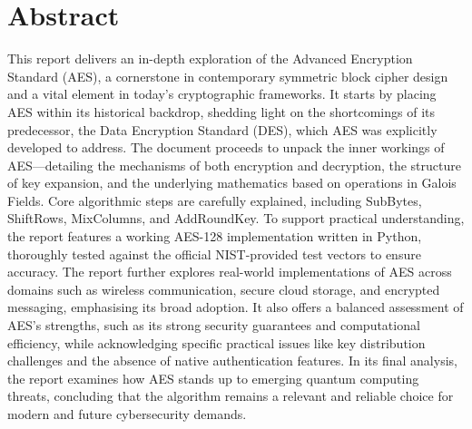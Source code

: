 \section*{Abstract} %

This report delivers an in-depth exploration of the Advanced Encryption Standard (AES), 
a cornerstone in contemporary symmetric block cipher design and a vital element in today’s cryptographic frameworks. 
It starts by placing AES within its historical backdrop, 
shedding light on the shortcomings of its predecessor, 
the Data Encryption Standard (DES), 
which AES was explicitly developed to address. 
The document proceeds to unpack the inner workings of AES—detailing the mechanisms of both encryption and decryption, 
the structure of key expansion, and the underlying mathematics based on operations in Galois Fields. 
Core algorithmic steps are carefully explained, 
including SubBytes, ShiftRows, MixColumns, and AddRoundKey. 
To support practical understanding, the report features a working AES-128 implementation written in Python, thoroughly tested against the official NIST-provided test vectors to ensure accuracy. 
The report further explores real-world implementations of AES across domains such as wireless communication, 
secure cloud storage, and encrypted messaging, emphasising its broad adoption. 
It also offers a balanced assessment of AES’s strengths, 
such as its strong security guarantees and computational efficiency, 
while acknowledging specific practical issues like key distribution challenges and the absence of native authentication features. 
In its final analysis, 
the report examines how AES stands up to emerging quantum computing threats, 
concluding that the algorithm remains a relevant and reliable choice for modern and future cybersecurity demands.

